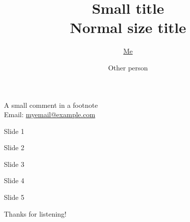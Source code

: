 \documentclass[14pt,aspectratio=169]{beamer}
\title{\small{Small title}\\
\vspace{0.3cm}
\normalsize{Normal size title}
}
\author{\underline{Me} \inst{1} \and Other person \inst{2}}
\institute[shortinst]{\inst{1} My Institute \samelineand \inst{2} Another Institute}
\newcommand{\beginbackup}{
	\newcounter{framenumbervorappendix}
	\setcounter{framenumbervorappendix}{\value{framenumber}}
}
\begin{document}
{
  \begin{frame}
    \titlepage
    {\centering\footnotesize A small comment in a footnote}\\
    {\tiny
    Email: {\color{blue} \href{mailto:myemail@example.com}{myemail@example.com}}}
  \end{frame}
}

\begin{frame}{Slide 1}
\centering
\end{frame}

\begin{frame}{Slide 2}
\centering
\end{frame}

\begin{frame}{Slide 3}
\centering
\end{frame}

\begin{frame}{Slide 4}
\centering
\end{frame}

\begin{frame}{Slide 5}
\centering
\end{frame}

\begin{frame}
\centering
\Large{Thanks for listening!}
\end{frame}


%	
%		

\end{document}

